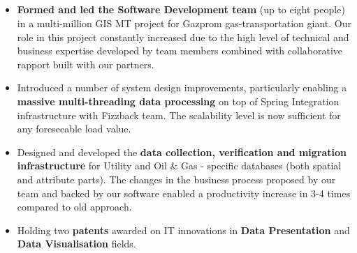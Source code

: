 \documentclass{res}
\newif\ifFullVersion
\begin{document}
\begin{resume}
\section{}
\vspace{8pt}
\begin{itemize}
\item {\bf Formed and led the Software Development team} (up to eight people) in a multi-million GIS MT project for Gazprom gas-transportation giant. Our role in this project constantly increased due to the high level of technical and business expertise developed by team members combined with collaborative rapport built with our partners.
\item Introduced a number of system design improvements, particularly enabling a {\bf massive multi-threading data processing} on top of Spring Integration infrastructure with Fizzback team. The scalability level is now sufficient for any foreseeable load value.
\item Designed and developed the {\bf data collection, verification and migration infrastructure} for Utility and Oil \& Gas - specific databases (both spatial and attribute parts). The changes in the business process proposed by our team and backed by our software enabled a productivity increase in 3-4 times compared to old approach.
\item Holding two {\bf patents} awarded on IT innovations in {\bf Data Presentation} and {\bf Data Visualisation} fields.
\ifFullVersion
\item As a {\bf Principal Developer / Architect} made a key contribution to the success of the PS\&E project when worked for Kring LLC. Despite unusual team configuration and inconvenient technology set the system showed {\bf good performance and reliability} achieved with a {\bf purpose-built testing facility}.
\item Built a set of the state- and local- {\bf budget data management tools} when worked in a large KPMG consultancy projects for the Ministry of Finance of Ukraine. The projects enjoyed the great success and were credited with eliminating 2 months from the budget development cycle.
\item Two times won the special prizes in {\bf ``Thinking Out of the Box''} nominations during the traditional {\bf Hack Day} events in MapInfo / Pitney Bowes.
\fi
\end{itemize}


\end{resume}
\end{document}

